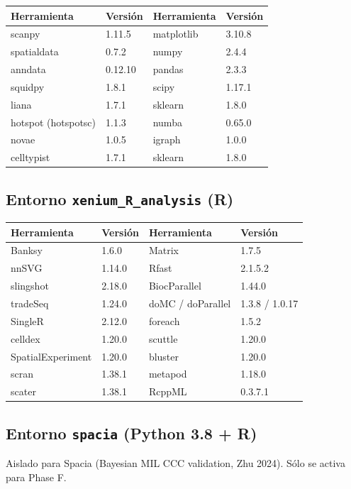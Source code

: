 \documentclass[11pt,a4paper]{article}
\begin{document}
\begin{tabular}{|l|l||l|l|}
\hline
\rowcolor{lightgray}\textbf{Herramienta} & \textbf{Versión} & \textbf{Herramienta} & \textbf{Versión} \\
\hline
scanpy & 1.11.5 & matplotlib & 3.10.8 \\
spatialdata & 0.7.2 & numpy & 2.4.4 \\
anndata & 0.12.10 & pandas & 2.3.3 \\
squidpy & 1.8.1 & scipy & 1.17.1 \\
liana & 1.7.1 & sklearn & 1.8.0 \\
hotspot (hotspotsc) & 1.1.3 & numba & 0.65.0 \\
novae & 1.0.5 & igraph & 1.0.0 \\
celltypist & 1.7.1 & sklearn & 1.8.0 \\
\hline
\end{tabular}

\subsection{Entorno \texttt{xenium\_R\_analysis} (R)}

\begin{tabular}{|l|l||l|l|}
\hline
\rowcolor{lightgray}\textbf{Herramienta} & \textbf{Versión} & \textbf{Herramienta} & \textbf{Versión} \\
\hline
Banksy & 1.6.0 & Matrix & 1.7.5 \\
nnSVG & 1.14.0 & Rfast & 2.1.5.2 \\
slingshot & 2.18.0 & BiocParallel & 1.44.0 \\
tradeSeq & 1.24.0 & doMC / doParallel & 1.3.8 / 1.0.17 \\
SingleR & 2.12.0 & foreach & 1.5.2 \\
celldex & 1.20.0 & scuttle & 1.20.0 \\
SpatialExperiment & 1.20.0 & bluster & 1.20.0 \\
scran & 1.38.1 & metapod & 1.18.0 \\
scater & 1.38.1 & RcppML & 0.3.7.1 \\
\hline
\end{tabular}

\subsection{Entorno \texttt{spacia} (Python 3.8 + R)}

Aislado para Spacia (Bayesian MIL CCC validation, Zhu 2024). Sólo se activa para Phase F.
\end{document}
